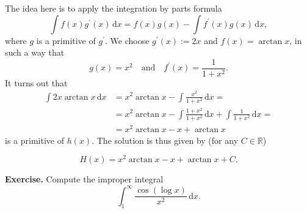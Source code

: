 \documentclass[a4paper,10 pt]{report}
\newcommand{\finalanswer}[1]{%
    \begin{finalAnswer}
    \[
        #1
    \]
    \end{finalAnswer}
}
\theoremstyle{definition}
\newcommand{\R}{\mathbb R}
\begin{document}
\begin{solutionBox} The idea here is to apply the integration by parts formula
\begin{equation} \label{byparts} \int f(x) g^\prime(x) \, \mathrm{d}x = f(x) g(x) - \int f^\prime(x) g(x) \, \mathrm{d}x, \end{equation}
where $g$ is a primitive of $g^\prime$. We choose $g^\prime(x) := 2x$ and $f(x) = \arctan x$, in such a way that
\begin{equation*} g(x) = x^2 \quad \text{and} \quad f^\prime(x) = \frac{1}{1 + x^2}. \end{equation*}
It turns out that
\begin{equation*} \begin{aligned} \int 2x \arctan x \, \mathrm{d}x &  = x^2 \arctan x - \int \frac{x^2}{1 + x^2} \, \mathrm{d}x =
\\[1em] & = x^2 \arctan x - \int \frac{1 + x^2}{1 + x^2} \, \mathrm{d}x + \int \frac{1}{1 + x^2} \, \mathrm{d}x =
\\[1em] & = x^2 \arctan x - x + \arctan x \end{aligned} \end{equation*}
is a primitive of $h(x)$. The solution is thus given by (for any $C \in \R$)
\finalanswer{
 H(x) = x^2 \arctan x - x + \arctan x + C.
}\end{solutionBox}

\begin{exerciseBox} \textbf{Exercise.} Compute the improper integral
\begin{equation*} \int_1^\infty \frac{ \cos(\log x) }{x^2} \, \mathrm{d}x. \end{equation*}
\end{exerciseBox}
\end{document}
